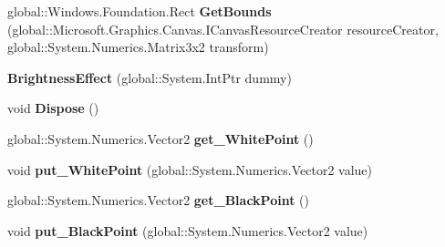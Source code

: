\begin{DoxyCompactItemize}
\item 
\mbox{\label{class_microsoft_1_1_graphics_1_1_canvas_1_1_effects_1_1_brightness_effect_a2ff8861d383cf6930766e1f6da167f7d}} 
global\+::\+Windows.\+Foundation.\+Rect {\bfseries Get\+Bounds} (global\+::\+Microsoft.\+Graphics.\+Canvas.\+I\+Canvas\+Resource\+Creator resource\+Creator, global\+::\+System.\+Numerics.\+Matrix3x2 transform)
\item 
\mbox{\label{class_microsoft_1_1_graphics_1_1_canvas_1_1_effects_1_1_brightness_effect_a3e6e5d15295d036a491135b47f360da7}} 
{\bfseries Brightness\+Effect} (global\+::\+System.\+Int\+Ptr dummy)
\item 
\mbox{\label{class_microsoft_1_1_graphics_1_1_canvas_1_1_effects_1_1_brightness_effect_afaaded4b2565482485f12b97a40a0da8}} 
void {\bfseries Dispose} ()
\item 
\mbox{\label{class_microsoft_1_1_graphics_1_1_canvas_1_1_effects_1_1_brightness_effect_af8c1beaca4eb324bb24eaae396efa916}} 
global\+::\+System.\+Numerics.\+Vector2 {\bfseries get\+\_\+\+White\+Point} ()
\item 
\mbox{\label{class_microsoft_1_1_graphics_1_1_canvas_1_1_effects_1_1_brightness_effect_acedd43ed76b47e67db67b3b351732d75}} 
void {\bfseries put\+\_\+\+White\+Point} (global\+::\+System.\+Numerics.\+Vector2 value)
\item 
\mbox{\label{class_microsoft_1_1_graphics_1_1_canvas_1_1_effects_1_1_brightness_effect_ac7be5f6aa71740a4754dfbdeb1fc3515}} 
global\+::\+System.\+Numerics.\+Vector2 {\bfseries get\+\_\+\+Black\+Point} ()
\item 
\mbox{\label{class_microsoft_1_1_graphics_1_1_canvas_1_1_effects_1_1_brightness_effect_ace38eda2b5d63e091a80c2ca5ce0c214}} 
void {\bfseries put\+\_\+\+Black\+Point} (global\+::\+System.\+Numerics.\+Vector2 value)

\end{DoxyCompactItemize}
